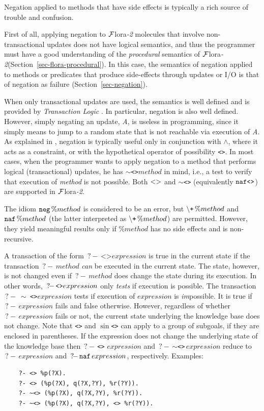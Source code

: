 \documentclass[11pt]{article}
\newcommand{\query}{\mbox{$\, ?\! - \, $}}                  %
\newcommand{\FLORA}{{\mbox{\sc ${\cal F}${lora}\rm\emph{-2}}}\xspace}
\newcommand{\PLGNAF}{\mbox{\tt \ensuremath{\tt\backslash}+}\xspace}
\newcommand{\SILKNAF}{{{\tt naf}}\xspace}
\begin{document}
Negation applied to methods that have side effects is typically a rich source
of trouble and confusion.

First of all, applying negation to \FLORA molecules that involve
non-transactional updates does not have logical semantics, and thus the
programmer must have a good understanding of the \emph{procedural} semantics of
\FLORA (Section~\ref{sec-flora-procedural}).
In this case, the semantics of negation applied to methods or predicates that produce
side-effects through updates  or I/O is that of negation as failure
(Section~\ref{sec-negation}).

When only transactional updates are used, the semantics is well defined and
is provided by \emph{Transaction Logic}
\cite{trans-chapter-98,trans-tcs94}. In particular, negation is also well
defined. However, simply negating an update, \emph{A}, is useless in
programming, since it simply means to jump to a random state that is not
reachable via execution of \emph{A}.  As explained in
\cite{trans-chapter-98,trans-tcs94}, negation is typically useful only in conjunction
with $\wedge$, where it acts as a constraint, or with the hypothetical
operator of possibility \texttt{<>}.  In most cases, when the programmer
wants to apply negation to a method that performs logical (transactional)
updates, he has \texttt{$\sim$<>}$method$  in mind, i.e., a test to
verify that execution of \emph{method}  is not possible.
Both $\tt<>$ and \texttt{$\sim$<>} (equivalently $\tt\SILKNAF \texttt{<>}$) are supported in \FLORA.

The idiom ${\tt neg}\,\%method$ is considered to be an error, but
$\PLGNAF\,\%method$ and $\SILKNAF\,\%method$ (the latter interpreted as
$\PLGNAF\,\%method$) are permitted. However, they yield meaningful results only
if $\%method$ has no side effects and is non-recursive.

A transaction of the form $\query \texttt{<>} expression$ is true in the current
state if the transaction $\query method$ \emph{can} be executed in the current
state. The state, however, is not changed even if  $\query method$
does change the state during its execution. In other words, $\texttt{\query <>}
expression$ only \emph{tests} if execution is possible.
The transaction \texttt{\query} \texttt{$\sim$ <>}$expression$ tests if execution of
$expression$ is \emph{im}possible. It is true if $\query expression$ fails
and false otherwise. However, regardless of whether $\query expression$
fails or not, the current state underlying the knowledge base does not
change.
Note that \texttt{<>} and \texttt{$\sin$<>} can apply to a group of
subgoals, if they are enclosed in parentheses.  If the expression does not
change the underlying state of the knowledge base then
\texttt{\query <>} $expression$ and \query\texttt{$\sim$<>}\,$expression$ reduce to
$\query expression$ and $\query \SILKNAF\,expression$, respectively.
Examples:
\begin{verbatim}
    ?- <> %p(?X).
    ?- <> (%p(?X), q(?X,?Y), %r(?Y)).
    ?- ~<> (%p(?X), q(?X,?Y), %r(?Y)).
    ?- ~<> (%p(?X), q(?X,?Y), <> %r(?Y)).
\end{verbatim}
\end{document}
